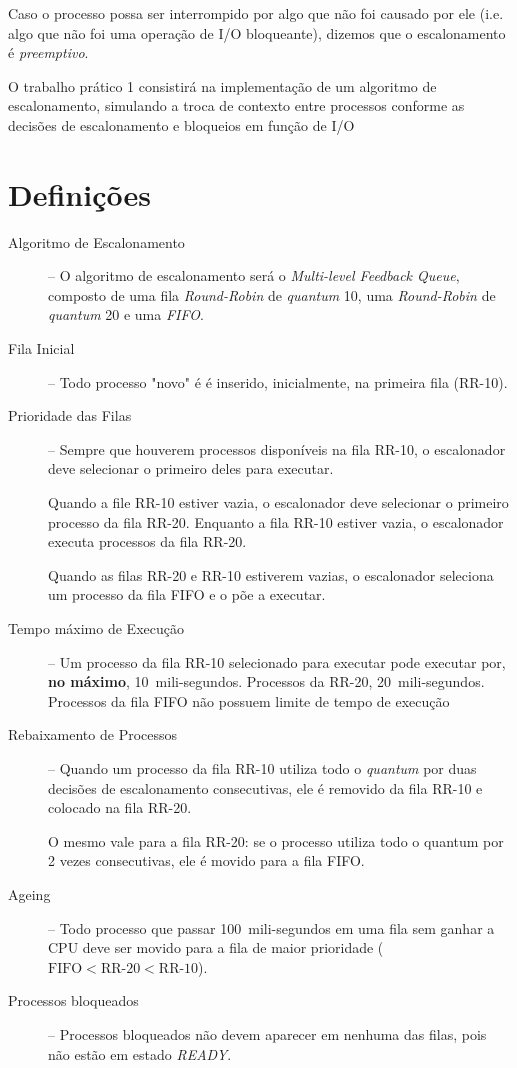\documentclass[a4paper, oneside,12pt]{article}
\begin{document}
Caso o processo possa ser interrompido por algo que não foi causado por ele (i.e. algo que não foi uma operação de I/O bloqueante), dizemos que o escalonamento é \emph{preemptivo}.

O trabalho prático 1 consistirá na implementação de um algoritmo de escalonamento, simulando a troca de contexto entre processos conforme as decisões de escalonamento e bloqueios em função de I/O

\section{Definições}
\label{sec:definicoes}

\begin{description}
    \item [Algoritmo de Escalonamento] -- O algoritmo de escalonamento será o \emph{Multi-level Feedback Queue}, composto de uma fila \emph{Round-Robin} de \emph{quantum} 10, uma \emph{Round-Robin} de {\em quantum} 20 e uma \emph{FIFO}.

    \item [Fila Inicial] -- Todo processo "novo" é é inserido, inicialmente, na primeira fila (RR-10).

    \item [Prioridade das Filas] -- Sempre que houverem processos disponíveis na fila RR-10, o escalonador deve selecionar o primeiro deles para executar.

        Quando a file RR-10 estiver vazia, o escalonador deve selecionar o primeiro processo da fila RR-20. Enquanto a fila RR-10 estiver vazia, o escalonador executa processos da fila RR-20.

        Quando as filas RR-20 e RR-10 estiverem vazias, o escalonador seleciona um processo da fila FIFO e o põe a executar.

    \item [Tempo máximo de Execução] -- Um processo da fila RR-10 selecionado para executar pode executar por, \textbf{no máximo}, 10~mili-segundos. Processos da RR-20, 20~mili-segundos. Processos da fila FIFO não possuem limite de tempo de execução

    \item[Rebaixamento de Processos] -- Quando um processo da fila RR-10 utiliza todo o \emph{quantum} por duas decisões de escalonamento consecutivas, ele é removido da fila RR-10 e colocado na fila RR-20.

        O mesmo vale para a fila RR-20: se o processo utiliza todo o quantum por 2 vezes consecutivas, ele é movido para a fila FIFO.

    \item[Ageing] -- Todo processo que passar 100~mili-segundos em uma fila sem ganhar a CPU deve ser movido para a fila de maior prioridade ($\textrm{FIFO} < \textrm{RR-20} < \textrm{RR-10}$).

    \item[Processos bloqueados] -- Processos bloqueados não devem aparecer em nenhuma das filas, pois não estão em estado \emph{READY}.
\end{description}
\end{document}
